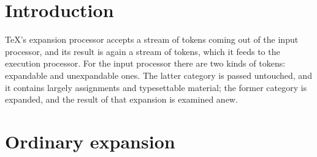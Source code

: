 \documentclass[twoside,letterpaper,openright]{rapport3}
\begin{document}
\section{Introduction}

\TeX's expansion processor accepts a stream of tokens
coming out of the input processor, and its result is
again a stream of tokens, which it feeds to the execution
processor. For the input processor there are two
kinds of tokens: expandable and unexpandable ones.
The latter category is passed untouched, and it contains
largely assignments and typesettable material;
the former category
is expanded, and the result of that expansion is examined anew.

\section{Ordinary expansion}
\end{document}
